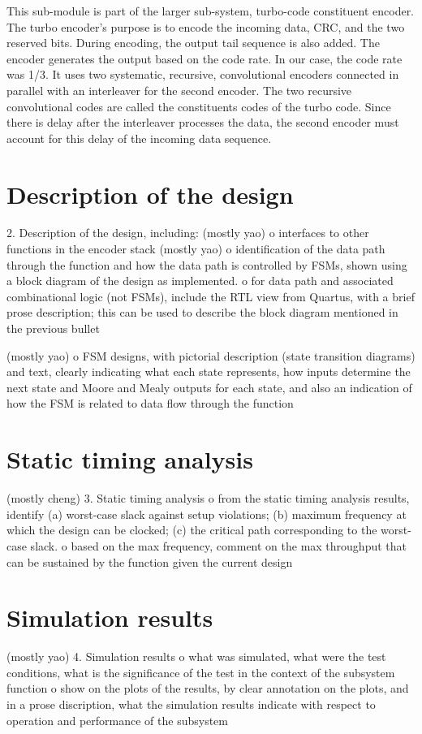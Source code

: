 \documentclass[letterpaper, 12pt]{article} %
\begin{document}
        This sub-module is part of the larger sub-system, turbo-code constituent encoder. The turbo encoder's purpose is to encode the incoming data, CRC, and the two reserved bits. During encoding, the output tail sequence is also added. The encoder generates the output based on the code rate. In our case, the code rate was 1/3. It uses two systematic, recursive, convolutional encoders connected in parallel with an interleaver for the second encoder. The two recursive convolutional codes are called the constituents codes of the turbo code. Since there is delay after the interleaver processes the data, the second encoder must account for this delay of the incoming data sequence.
\section{Description of the design}
    2.  Description of the design, including:
        (mostly yao)
         o  interfaces to other functions in the encoder stack
        (mostly yao)
         o  identification of the data path through the function and
		    how the data path is controlled by FSMs, shown using a
			block diagram of the design as implemented.
         o  for data path and associated combinational logic (not FSMs), include
            the RTL view from Quartus, with a brief prose description;  this can
            be used to describe the block diagram mentioned in the
			previous bullet

		(mostly yao)
         o  FSM designs, with pictorial description (state transition diagrams)
            and text, clearly indicating what each state
            represents, how inputs determine the next state and Moore and Mealy
            outputs for each state, and also an indication of how the FSM is
            related to data flow through the function
\section{Static timing analysis}
(mostly cheng)
    3.  Static timing analysis
		 o  from the static timing analysis results, identify (a) worst-case slack
		 	against setup violations;  (b) maximum frequency at which the design
			can be clocked;  (c) the critical path corresponding to the worst-case
			slack.
		 o	based on the max frequency, comment on the max throughput that can
		 	be sustained by the function given the current design
\section{Simulation results}
(mostly yao)
	4.  Simulation results
         o  what was simulated, what were the test conditions, what is the
            significance of the test in the context of the subsystem function
         o  show on the plots of the results, by clear annotation on the plots,
            and in a prose discription, what the simulation results indicate with
            respect to operation and performance of the subsystem
\end{document}
